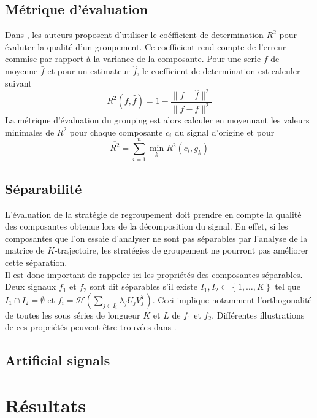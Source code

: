 \documentclass{gretsi}
\begin{document}
\subsection{Métrique d'évaluation}
\label{sub:}
Dans \cite{abalov_14_aut}, les auteurs proposent d'utiliser le coéfficient de determination $R^2$ pour évaluter la qualité d'un groupement. Ce coefficient rend compte de l'erreur commise par rapport à la variance de la composante. Pour une serie $f$ de moyenne $\bar f$ et pour un estimateur $\hat f$, le coefficient de determination est calculer suivant$$
R^2(f, \hat f) = 1 - \frac{\|f-\hat f\|^2}{\|f-\bar f\|^2}
$$ La métrique d'évaluation du grouping est alors calculer  en moyennant les valeurs minimales de $R^2$ pour chaque composante $c_i$ du signal d'origine et pour $$
\overline{ R^2} = \sum_{i=1}^n \min_k R^2(c_i, g_k)
$$


\subsection{Séparabilité}
\label{sub:sep}
    L'évaluation de la stratégie de regroupement doit prendre en compte la qualité des composantes obtenue lors de la décomposition du signal. En effet, si les composantes que l'on essaie d'analyser ne sont pas séparables par l'analyse de la matrice de $K$-trajectoire, les stratégies de groupement ne pourront pas améliorer cette séparation.\\
    
    Il est donc important de rappeler ici les propriétés des composantes séparables. Deux signaux $f_1$ et $f_2$ sont dit séparables s'il existe $I_1, I_2 \subset \left \{ 1,\dots, K \right \}$ tel que $I_1\cap I_2 = \emptyset$ et $f_i = \mathcal H(\sum_{j \in I_i} \lambda_j U_j V_j^T)$. Ceci implique notamment l'orthogonalité de toutes les sous séries de longueur $K$ et $L$ de $f_1$ et $f_2$. Différentes illustrations de ces propriétés peuvent être trouvées dans \cite{GNZ_10_SSA}.


\subsection{Artificial signals}
\label{sub:}


\section{Résultats} 
\end{document}
